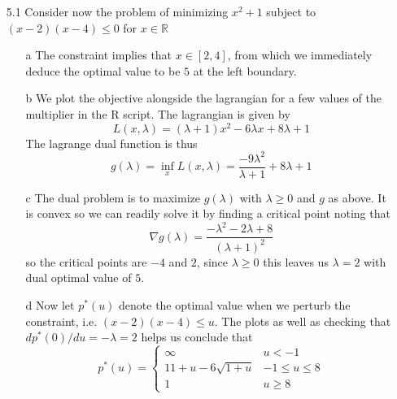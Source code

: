 \documentclass[12pt]{article}
\begin{document}
\begin{itemize}
\item[5.1] Consider now the problem of minimizing $x^2 + 1$ subject to $(x-2)(x-4) \leq 0$ for $x \in \mathbb{R}$
  \begin{enumerate}
  \item[a] The constraint implies that $x \in [2, 4]$, from which we immediately deduce the optimal value to be $5$ at the left boundary.
  \item[b] We plot the objective alongside the lagrangian for a few values of the multiplier in the R script.
    The lagrangian is given by
    $$L(x,\lambda) = (\lambda + 1)x^2 - 6 \lambda x + 8 \lambda + 1$$
    The lagrange dual function is thus
    $$g(\lambda) = \inf_x L(x, \lambda) = \frac{-9 \lambda^2}{\lambda + 1} + 8 \lambda + 1$$
  \item[c] The dual problem is to maximize $g(\lambda)$ with $\lambda \geq 0$ and $g$ as above. It is convex so we can readily solve it by finding a critical point noting that
    $$\nabla g(\lambda) = \frac{-\lambda^2 - 2 \lambda + 8}{(\lambda + 1)^2}$$
    so the critical points are $-4$ and $2$, since $\lambda \geq 0$ this leaves us $\lambda = 2$ with dual optimal value of $5$.
  \item[d] Now let $p^*(u)$ denote the optimal value when we perturb the constraint, i.e. $(x-2)(x-4) \leq u$. The plots as well as checking that $dp^*(0)/du = -\lambda = 2$ helps us conclude that
    $$p^*(u) = \begin{cases}
      \infty & u < -1 \\
      11 + u - 6 \sqrt{1+u} & -1 \leq u \leq 8\\
      1 & u \geq 8
      \end{cases}$$
    \end{enumerate}
    

\end{itemize}
\end{document}

